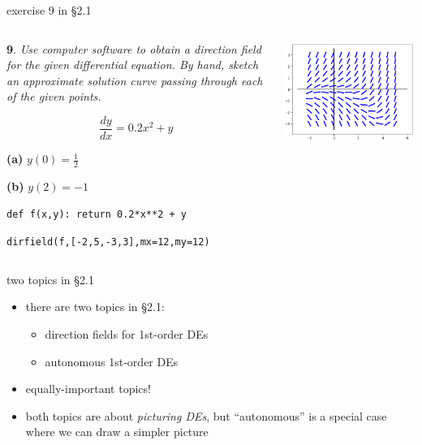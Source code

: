 \documentclass[colorlinks]{beamer}
\begin{document}
\begin{frame}{exercise 9 in \S 2.1}

\begin{columns}
\begin{column}{0.45\textwidth}
\small
\noindent \textbf{9}.  \emph{Use computer software to obtain a direction field for the given differential equation.  By hand, sketch an approximate solution curve passing through each of the given points.}

$$\frac{dy}{dx} = 0.2 x^2 + y$$

\noindent \textbf{(a)} \quad $y(0)=\tfrac{1}{2}$

\noindent \textbf{(b)} \quad $y(2)=-1$

\vspace{15mm}

\scriptsize
\texttt{def f(x,y):  return 0.2*x**2 + y}

\texttt{dirfield(f,[-2,5,-3,3],mx=12,my=12)}
\end{column}
\begin{column}{0.55\textwidth}

\hspace{-10mm} \includegraphics[width=1.15\textwidth]{figs/exercise-9-2-1}
\end{column}
\end{columns}
\end{frame}


\begin{frame}{two topics in \S 2.1}

\begin{itemize}
\item there are two topics in \S 2.1:
    \begin{itemize}
    \item direction fields for 1st-order DEs
    \item autonomous 1st-order DEs
    \end{itemize}
\item equally-important topics!
\item both topics are about \emph{picturing DEs}, but ``autonomous'' is a special case where we can draw a simpler picture
\end{itemize}
\end{frame}
\end{document}
